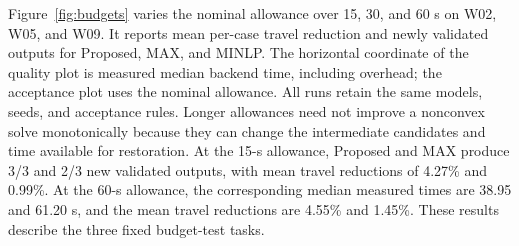 Figure~\ref{fig:budgets} varies the nominal allowance over 15, 30, and 60 s on W02, W05, and W09. It reports mean per-case travel reduction and newly validated outputs for Proposed, MAX, and MINLP. The horizontal coordinate of the quality plot is measured median backend time, including overhead; the acceptance plot uses the nominal allowance. All runs retain the same models, seeds, and acceptance rules. Longer allowances need not improve a nonconvex solve monotonically because they can change the intermediate candidates and time available for restoration.
At the 15-s allowance, Proposed and MAX produce 3/3 and 2/3 new validated outputs, with mean travel reductions of 4.27\% and 0.99\%. At the 60-s allowance, the corresponding median measured times are 38.95 and 61.20 s, and the mean travel reductions are 4.55\% and 1.45\%. These results describe the three fixed budget-test tasks.
